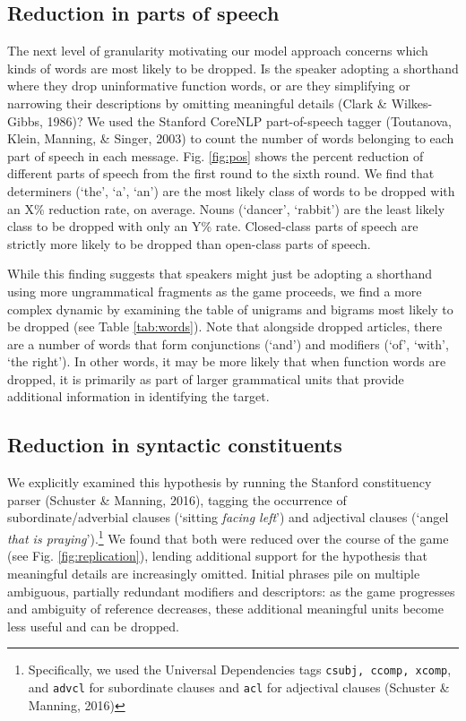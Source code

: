\documentclass[alpha-refs]{wiley-article}
\begin{document}
\subsection{Reduction in parts of speech}
The next level of granularity motivating our model approach concerns
which kinds of words are most likely to be dropped. Is the speaker
adopting a shorthand where they drop uninformative function words, or
are they simplifying or narrowing their descriptions by omitting
meaningful details (Clark \& Wilkes-Gibbs, 1986)? We used the Stanford
CoreNLP part-of-speech tagger (Toutanova, Klein, Manning, \& Singer,
2003) to count the number of words belonging to each part of speech in
each message. Fig. \ref{fig:pos} shows the percent reduction of
different parts of speech from the first round to the sixth round. We
find that determiners (`the', `a', `an') are the most likely class of
words to be dropped with an X\% reduction rate, on average. Nouns
(`dancer', `rabbit') are the least likely class to be dropped with only
an Y\% rate. Closed-class parts of speech are strictly more likely to be
dropped than open-class parts of speech.

While this finding suggests that speakers might just be adopting a
shorthand using more ungrammatical fragments as the game proceeds, we
find a more complex dynamic by examining the table of unigrams and
bigrams most likely to be dropped (see Table \ref{tab:words}). Note that
alongside dropped articles, there are a number of words that form
conjunctions (`and') and modifiers (`of', `with', `the right'). In other
words, it may be more likely that when function words are dropped, it is
primarily as part of larger grammatical units that provide additional
information in identifying the target.

\subsection{Reduction in syntactic constituents}
We explicitly examined this hypothesis by running the Stanford
constituency parser (Schuster \& Manning, 2016), tagging the occurrence
of subordinate/adverbial clauses (`sitting \emph{facing left}') and
adjectival clauses (`angel \emph{that is praying}').\footnote{Specifically,
  we used the Universal Dependencies tags \texttt{csubj, ccomp, xcomp},
  and \texttt{advcl} for subordinate clauses and \texttt{acl} for
  adjectival clauses (Schuster \& Manning, 2016)} We found that both
were reduced over the course of the game (see Fig.
\ref{fig:replication}), lending additional support for the hypothesis
that meaningful details are increasingly omitted. Initial phrases pile
on multiple ambiguous, partially redundant modifiers and descriptors: as
the game progresses and ambiguity of reference decreases, these
additional meaningful units become less useful and can be dropped.
\end{document}
